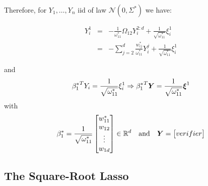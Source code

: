 Therefore, for $Y_1,\dots,Y_n$ iid of law $\mathcal N(0,\Sigma^*)$ we have:

\begin{equation}
\begin{array}{lcl}
  Y_i^1&=&-\frac{1}{\omega_{11}^*}\Omega_{12}Y_i^{2:d}+\frac{1}{\sqrt{\omega_{11}^*}}\xi^1_i\\
  &=&-\sum_{j=2}^{d}\frac{w_{ij}^*}{\omega_{11}^*}Y_i^j+\frac{1}{\sqrt{\omega_{11}^*}}\xi^1_i
\end{array}
\end{equation}

and
\begin{equation}
{\beta_1^*}^TY_i=\frac{1}{\sqrt{\omega_{11}^*}}\xi^1_i
\Rightarrow
{\beta_1^*}^T\boldsymbol Y=\frac{1}{\sqrt{\omega_{11}^*}}\boldsymbol \xi^1
\end{equation}
with
\begin{equation}
\beta_1^*=\frac{1}{\sqrt{\omega_{11}^*}}
  \begin{bmatrix}
  w_{11}^*\\
  w_{12}\\
  \vdots\\
  w_{1d}
  \end{bmatrix}
  \in {\mathbb R}^d
  \quad \text{and}\quad \boldsymbol Y= \begin{bmatrix}
  verifier\\
  \end{bmatrix}
\end{equation}
\subsection{The Square-Root Lasso}

